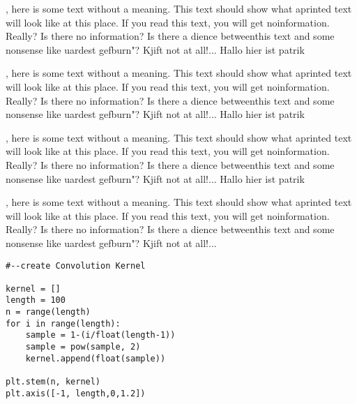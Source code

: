 , here is some text without a meaning.  This text should 
show what aprinted text will look like at this place.  If you 
read this text, you will get noinformation.  Really?  Is there 
no information?  Is there a dience betweenthis text and some 
nonsense like uardest gefburn"?  Kjift  not at all!...
Hallo hier ist patrik


, here is some text without a meaning.  This text should 
show what aprinted text will look like at this place.  If you 
read this text, you will get noinformation.  Really?  Is there 
no information?  Is there a dience betweenthis text and some 
nonsense like uardest gefburn"?  Kjift  not at all!...
Hallo hier ist patrik


, here is some text without a meaning.  This text should 
show what aprinted text will look like at this place.  If you 
read this text, you will get noinformation.  Really?  Is there 
no information?  Is there a dience betweenthis text and some 
nonsense like uardest gefburn"?  Kjift  not at all!...
Hallo hier ist patrik


, here is some text without a meaning.  This text should 
show what aprinted text will look like at this place.  If you 
read this text, you will get noinformation.  Really?  Is there 
no information?  Is there a dience betweenthis text and some 
nonsense like uardest gefburn"?  Kjift  not at all!...
\begin{verbatim}
#--create Convolution Kernel

kernel = []
length = 100
n = range(length)
for i in range(length):
    sample = 1-(i/float(length-1))
    sample = pow(sample, 2)
    kernel.append(float(sample))

plt.stem(n, kernel)
plt.axis([-1, length,0,1.2])
\end{verbatim}
